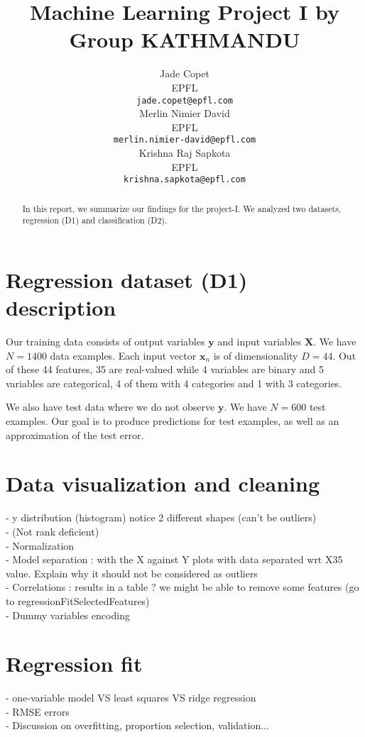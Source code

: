 \documentclass{article} %
\title{Machine Learning Project I by Group KATHMANDU}
\author{
Jade Copet\\
EPFL \\
\texttt{jade.copet@epfl.com} \\
\And
Merlin Nimier David\\
EPFL \\
\texttt{merlin.nimier-david@epfl.com} \\
\And
Krishna Raj Sapkota\\
EPFL \\
\texttt{krishna.sapkota@epfl.com} \\
}
\begin{document}
\maketitle

\begin{abstract}
  In this report, we summarize our findings for the project-I. We analyzed two datasets, regression (D1) and classification (D2).
\end{abstract}

\section{Regression dataset (D1) description}
  Our training data consists of output variables $\mathbf{y}$ and input variables $\mathbf{X}$. We have $N = 1400$ data examples. Each input vector $\mathbf{x}_n$ is of dimensionality $D = 44$. Out of these 44 features, 35 are real-valued while 4 variables are binary and 5 variables are categorical, 4 of them with 4 categories and 1 with 3 categories.

  We also have test data where we do not observe $\mathbf{y}$. We have $N = 600$ test examples. Our goal is to produce predictions for test examples, as well as an approximation of the test error.

\section{Data visualization and cleaning}
  - y distribution (histogram) notice 2 different shapes (can't be outliers)\\
  - (Not rank deficient)\\
  - Normalization\\
  - Model separation : with the X against Y plots with data separated wrt X35 value. Explain why it should not be considered as outliers \\
  - Correlations : results in a table ? we might be able to remove some features (go to regressionFitSelectedFeatures)\\
  - Dummy variables encoding

\section{Regression fit}
  - one-variable model VS least squares VS ridge regression\\
  - RMSE errors\\
  - Discussion on overfitting, proportion selection, validation...
\end{document}
